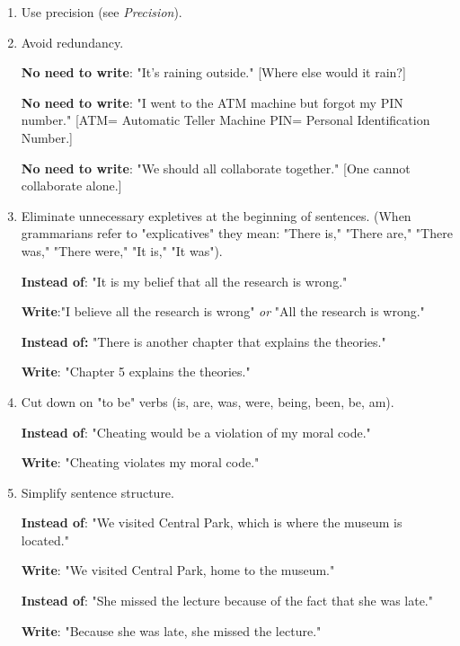  \begin{enumerate}
 
\item Use precision (see \emph{Precision}).
 
\item Avoid redundancy. 
 
\textbf{No need to write}: "It's raining outside."
[Where else would it rain?]
 
\textbf{No need to write}: "I went to the ATM machine but forgot my PIN number." 
 [ATM= Automatic Teller Machine PIN= Personal Identification Number.]
 
\textbf{No need to write}: "We should all collaborate together." 
[One cannot collaborate alone.]
 
 \item Eliminate unnecessary expletives at the beginning of sentences. (When 
grammarians refer to "explicatives" they mean: "There is," "There are," "There was," 
"There were," "It is," "It was"). 
 
  \textbf{Instead of}: "It is my belief that all the research is wrong."
 
                  	\textbf{Write}:"I believe all the research is wrong" \emph{or} 
"All the research is wrong."
 
 
             	\textbf{Instead of:}    	"There is another chapter that explains the theories."
 
                    	\textbf{Write}:       	"Chapter 5 explains the theories."
 
 
\item Cut down on "to be" verbs (is, are, was, were, being, been, be, am).
 
      	\textbf{Instead of}:  	"Cheating would be a violation of my moral code."
 
      	\textbf{Write}:          	"Cheating violates my moral code."
 
 
\item Simplify sentence structure.
 
    	\textbf{Instead of}: 	"We visited Central Park, which is where the museum is located."
 
    	\textbf{Write}:          	"We visited Central Park, home to the museum."
 
    	\textbf{Instead of}: "She missed the lecture because of the fact that she was late."
 
    	\textbf{Write}: "Because she was late, she missed the lecture."
 

\end{enumerate}
